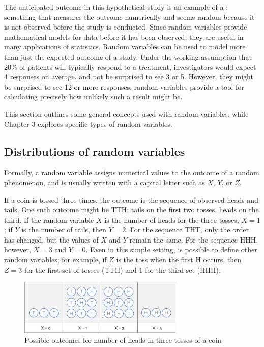 The anticipated outcome in this hypothetical study is an example of a : something that measures the outcome numerically and seems random because it is not observed before the study is conducted. Since random variables provide mathematical models for data before it has been observed, they are useful in many applications of statistics. Random variables can be used to model more than just the expected outcome of a study. Under the working assumption that 20\% of patients will typically respond to a treatment, investigators would expect 4 responses on average, and not be surprised to see 3 or 5. However, they might be surprised to see 12 or more responses; random variables provide a tool for calculating precisely how unlikely such a result might be.

This section outlines some general concepts used with random variables, while Chapter 3 explores specific types of random variables.


\subsection{Distributions of random variables}

Formally, a random variable assigns numerical values to the outcome of a random phenomenon, and is usually written with a capital letter such as $X$, $Y$, or $Z$. 

If a coin is tossed three times, the outcome is the sequence of observed heads and tails. One such outcome might be TTH: tails on the first two tosses, heads on the third. If the random variable $X$ is the number of heads for the three tosses, $X=1$; if $Y$ is the number of tails, then $Y=2$. For the sequence THT, only the order has changed, but the values of $X$ and $Y$ remain the same. For the sequence HHH, however, $X=3$ and $Y=0$. Even in this simple setting, is possible to define other random variables; for example, if $Z$ is the toss when the first H occurs, then $Z=3$ for the first set of tosses (TTH) and 1 for the third set (HHH).  

\begin{figure}[h]
	\centering
	\includegraphics[width=0.70\textwidth]
	{ch_probability_oi_biostat/figures/coinToss/coinToss.png}
	\caption{Possible outcomes for number of heads in three tosses of a coin}
	\label{coinToss}
\end{figure}


